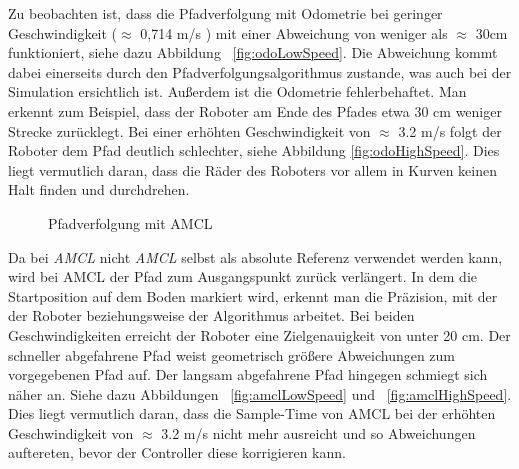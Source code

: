 \documentclass[11pt,a4paper]{article}
\begin{document}
{Zu beobachten ist, dass die Pfadverfolgung mit Odometrie bei geringer Geschwindigkeit ($\approx$ 0,714 m/s ) mit einer Abweichung von weniger als $\approx$ 30cm funktioniert, siehe dazu Abbildung ~\ref{fig:odoLowSpeed}. Die Abweichung kommt dabei einerseits durch den Pfadverfolgungsalgorithmus zustande, was auch bei der Simulation ersichtlich ist. Au{\ss}erdem ist die Odometrie fehlerbehaftet. Man erkennt zum Beispiel, dass der Roboter am Ende des Pfades etwa 30 cm weniger Strecke zur\"ucklegt.
Bei einer erh\"ohten Geschwindigkeit von $\approx$ 3.2 m/s folgt der Roboter dem Pfad deutlich schlechter, siehe Abbildung \ref{fig:odoHighSpeed}. Dies liegt vermutlich daran, dass die R\"ader des Roboters vor allem in Kurven keinen Halt finden und durchdrehen.   


\begin{figure}[h]
	\centering
	\caption{Pfadverfolgung mit AMCL}
\end{figure}

Da bei \textit{AMCL} nicht \textit{AMCL} selbst als absolute Referenz verwendet werden kann, wird bei AMCL der Pfad zum Ausgangspunkt zur\"uck verl\"angert. In dem die Startposition auf dem Boden markiert wird, erkennt man die Pr\"azision, mit der der Roboter beziehungsweise der Algorithmus arbeitet.
Bei beiden Geschwindigkeiten erreicht der Roboter eine Zielgenauigkeit von unter 20 cm. Der schneller abgefahrene Pfad weist geometrisch gr\"o{\ss}ere Abweichungen zum vorgegebenen Pfad auf. Der langsam abgefahrene Pfad hingegen schmiegt sich n\"aher an. Siehe dazu Abbildungen ~\ref{fig:amclLowSpeed} und ~\ref{fig:amclHighSpeed}.  
Dies liegt vermutlich daran, dass die Sample-Time von AMCL bei der erh\"ohten Geschwindigkeit  von $\approx$ 3.2 m/s nicht mehr ausreicht und so Abweichungen auftereten, bevor der Controller diese korrigieren kann. 

}
\end{document}
